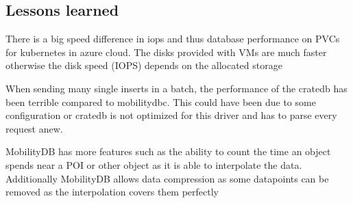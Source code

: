 \subsection{Lessons learned}

There is a big speed difference in iops and thus database performance on PVCs for kubernetes in azure cloud.
The disks provided with VMs are much faster otherwise the disk speed (IOPS) depends on the allocated storage

When sending many single inserts in a batch, the performance of the cratedb has been terrible compared to mobilitydbc.
This could have been due to some configuration or cratedb is not optimized for this driver and has to parse every request anew.

MobilityDB has more features such as the ability to count the time an object spends near a POI or other object as it is able to interpolate the data.
Additionally MobilityDB allows data compression as some datapoints can be removed as the interpolation covers them perfectly
